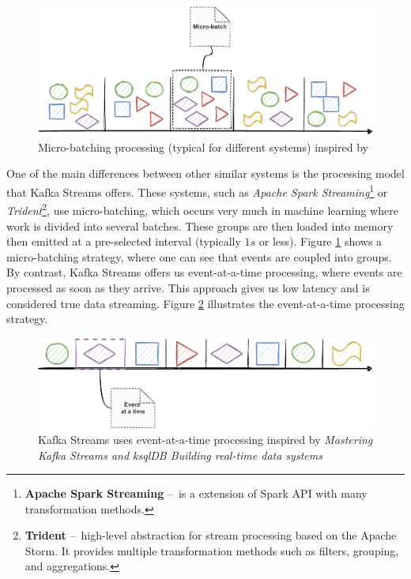 \begin{figure}[!ht]
    \centering
    \includegraphics[scale=0.78]{obrazky-figures/02-preliminaries/02-kafka/10-kafkaStreamsProces.pdf}
    \caption{Micro-batching processing (typical for different systems) inspired by \cite{kafkaStreamsBook}}
    \label{fig:02-kafkaStreamsProcessingBatch}
\end{figure}

One of the main differences between other similar systems is the processing model that Kafka Streams offers.
These systems, such as \emph{Apache Spark Streaming}\footnote{\textbf{Apache Spark Streaming} \---\ is a extension of Spark API with many transformation methods.} or \emph{Trident}\footnote{\textbf{Trident} \---\ high-level abstraction for stream processing based on the Apache Storm. It provides multiple transformation methods such as filters, grouping, and aggregations.}, use micro-batching, which occurs very much in machine learning where work is divided into several batches.
These groups are then loaded into memory then emitted at a pre-selected interval (typically $1s$ or less).
Figure \ref{fig:02-kafkaStreamsProcessingBatch} shows a micro-batching strategy, where one can see that events are coupled into groups.
By contrast, Kafka Streams offers us event-at-a-time processing, where events are processed as soon as they arrive.
This approach gives us low latency and is considered true data streaming. Figure \ref{fig:02-kafkaStreamsProcessingEvent} illustrates the event-at-a-time processing strategy.
\begin{figure}[!ht]
    \centering
    \includegraphics[scale=0.88]{obrazky-figures/02-preliminaries/02-kafka/11-kafkaStreamsProces2.pdf}
    \caption{Kafka Streams uses event-at-a-time processing inspired by \emph{Mastering Kafka Streams and ksqlDB Building real-time data systems} \cite{kafkaStreamsBook}}
    \label{fig:02-kafkaStreamsProcessingEvent}
\end{figure}


